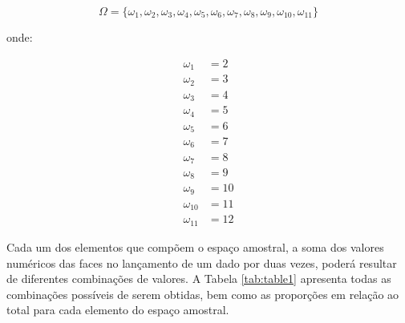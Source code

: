 \documentclass[
]{book}
\begin{document}
\hfill\break

\[
\Omega = \{\omega_{1}, \omega_{2}, \omega_{3}, \omega_{4}, \omega_{5}, \omega_{6}, \omega_{7}, \omega_{8}, \omega_{9}, \omega_{10}, \omega_{11}\}
\]

\hfill\break

onde:

\hfill\break

\begin{align*}
\omega_{1} & =  2\\
\omega_{2} & =  3\\
\omega_{3} & = 4\\
\omega_{4} & = 5\\
\omega_{5} & = 6\\
\omega_{6} & = 7 \\
\omega_{7} & = 8\\
\omega_{8} & = 9\\
\omega_{9} & = 10\\
\omega_{10} & = 11\\
\omega_{11} & = 12     
\end{align*}

\hfill\break

Cada um dos elementos que compõem o espaço amostral, a soma dos valores numéricos das faces no lançamento de um dado por duas vezes, poderá resultar de diferentes combinações de valores. A Tabela \ref{tab:table1} apresenta todas as combinações possíveis de serem obtidas, bem como as proporções em relação ao total para cada elemento do espaço amostral.

\hfill\break
\end{document}
